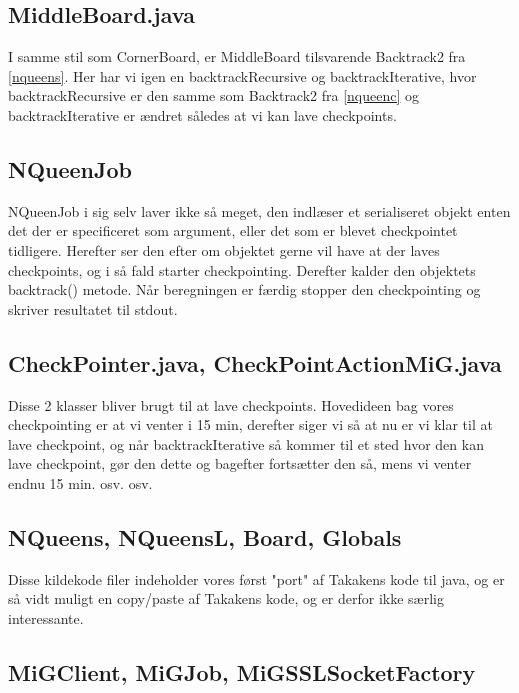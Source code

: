\documentclass[final,a4paper,11pt]{article}
\begin{document}
\subsection{MiddleBoard.java}

I samme stil som CornerBoard, er MiddleBoard tilsvarende Backtrack2 fra
\ref{nqueens}. Her har vi igen en backtrackRecursive og backtrackIterative, hvor
backtrackRecursive er den samme som Backtrack2 fra \ref{nqueenc} og
backtrackIterative er ændret således at vi kan lave checkpoints.

\subsection{NQueenJob}

NQueenJob i sig selv laver ikke så meget, den indlæser et serialiseret objekt
enten det der er specificeret som argument, eller det som er blevet checkpointet
tidligere. Herefter ser den efter om objektet gerne vil have at der laves
checkpoints, og i så fald starter checkpointing. Derefter kalder den objektets
backtrack() metode. Når beregningen er færdig stopper den checkpointing og
skriver resultatet til stdout.

\subsection{CheckPointer.java, CheckPointActionMiG.java}

Disse 2 klasser bliver brugt til at lave checkpoints. Hovedideen bag vores
checkpointing er at vi venter i 15 min, derefter siger vi så at nu er vi klar
til at lave checkpoint, og når backtrackIterative så kommer til et sted hvor den
kan lave checkpoint, gør den dette og bagefter fortsætter den så, mens vi venter
endnu 15 min. osv. osv. 

\subsection{NQueens, NQueensL, Board, Globals}

Disse kildekode filer indeholder vores først "port" af Takakens kode til java,
og er så vidt muligt en copy/paste af Takakens kode, og er derfor ikke særlig
interessante. 

\subsection{MiGClient, MiGJob, MiGSSLSocketFactory}
\end{document}
